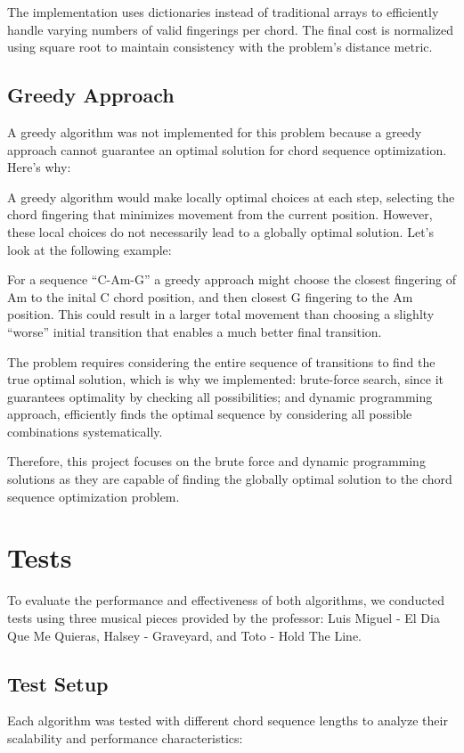 \documentclass[conference]{IEEEtran}
\begin{document}
The implementation uses dictionaries instead of traditional arrays to efficiently handle varying numbers of valid fingerings per chord. The final cost is normalized using square root to maintain consistency with the problem's distance metric.



\subsection{Greedy Approach}
A greedy algorithm was not implemented for this problem because a greedy approach cannot guarantee an optimal solution for chord sequence optimization. Here's why:

A greedy algorithm would make locally optimal choices at each step, selecting the chord fingering that minimizes movement from the current position. However, these local choices do not necessarily lead to a globally optimal solution. Let's look at the following example:

For a sequence ``C-Am-G'' a greedy approach might choose the closest fingering of Am to the inital C chord position, and then closest G fingering to the Am position. This could result in a larger total movement than choosing a slighlty ``worse'' initial transition that enables a much better final transition.

The problem requires considering the entire sequence of transitions to find the true optimal solution, which is why we implemented: brute-force search, since it guarantees optimality by checking all possibilities; and dynamic programming approach, efficiently finds the optimal sequence by considering all possible combinations systematically.

Therefore, this project focuses on the brute force and dynamic programming solutions as they are capable of finding the globally optimal solution to the chord sequence optimization problem.

\section{Tests}
To evaluate the performance and effectiveness of both algorithms, we conducted tests using three musical pieces provided by the professor: Luis Miguel - El Dia Que Me Quieras, Halsey - Graveyard, and Toto - Hold The Line. 

\subsection{Test Setup}
Each algorithm was tested with different chord sequence lengths to analyze their scalability and performance characteristics:
\end{document}
